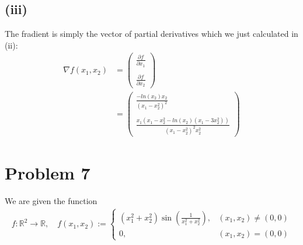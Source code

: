 \documentclass{article}
\begin{document}
\subsection*{(iii)}
The fradient is simply the vector of partial derivatives which we just calculated in (ii):
\begin{align*}
   \nabla f(x_1, x_2) &= \begin{pmatrix}
                           \frac{\partial f}{\partial x_1} \\
                           \\
                           \frac{\partial f}{\partial x_2}
                        \end{pmatrix} \\
    &= \begin{pmatrix}
      \frac{-ln(x_2)x_2}{(x_1 - x_2^2)^2} \\
      \\
      \frac{x_1 (x_1 - x_2^2 - ln(x_2) (x_1 - 3x_2^2))}{(x_1 - x_2^2)^2 x_2^2}
   \end{pmatrix}
\end{align*}

\section*{Problem 7}
We are given the function
\begin{align*}
   f : \mathbb{R}^2 \to \mathbb{R}, \quad f(x_1, x_2) :=
   \begin{cases}
      (x_1^2 + x_2^2) \sin\left(\frac{1}{x_1^2 + x_2^2}\right), & (x_1, x_2) \neq (0, 0) \\
      0, & (x_1, x_2) = (0, 0)
   \end{cases}
\end{align*}
\end{document}
